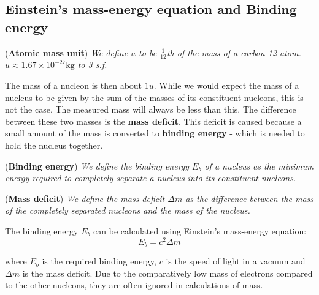 \subsection{Einstein's mass-energy equation and Binding energy}
\begin{definition}{(\textbf{Atomic mass unit})} 
\textit{We define \(u\) to be \(\frac 1 {12}\)th of the mass of a carbon-12 atom. \(u \approx 1.67 \times 10^{-27} \textrm{kg}\) to 3 s.f.}
\end{definition} 

The mass of a nucleon is then about \(1u\). While we would expect the mass of a nucleus to be given by the sum of the masses of its constituent nucleons, this is not the case. The measured mass will always be less than this. The difference between these two masses is the \textbf{mass deficit}. This deficit is caused because a small amount of the mass is converted to \textbf{binding energy} - which is needed to hold the nucleus together. 

\begin{definition}{(\textbf{Binding energy})}
\textit{We define the binding energy $E_b$ of a nucleus as the minimum energy required to completely separate a nucleus into its constituent nucleons.}
\end{definition}
\begin{definition}({\textbf{Mass deficit}})
\textit{We define the mass deficit $\Delta m$ as the difference between the mass of the completely separated nucleons and the mass of the nucleus.}
\end{definition}

The binding energy $E_b$ can be calculated using Einstein's mass-energy equation: 
\begin{equation*}
E_b = c^2 \Delta m
\end{equation*} 

where \(E_b\) is the required binding energy, \(c\) is the speed of light in a vacuum and \(\Delta m\) is the mass deficit. Due to the comparatively low mass of electrons compared to the other nucleons, they are often ignored in calculations of mass. 


